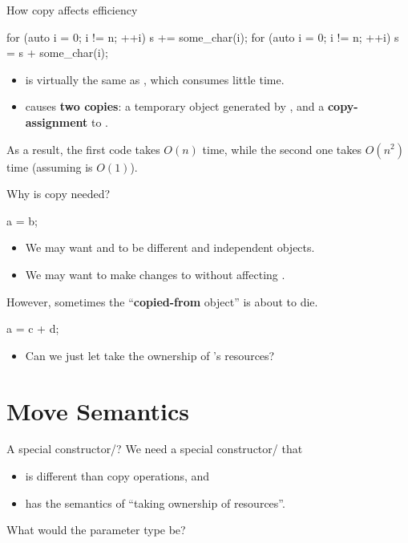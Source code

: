 \documentclass{beamer}
\begin{document}
\begin{frame}[fragile]{How copy affects efficiency}
  \begin{cpp}
for (auto i = 0; i != n; ++i)
  s += some_char(i);
for (auto i = 0; i != n; ++i)
  s = s + some_char(i);
  \end{cpp}
  \begin{itemize}
    \item {} is virtually the same as , which consumes little time.
    \item {} causes \textbf{two copies}: a temporary object generated by , and a \textbf{copy-assignment} to .
  \end{itemize}
  \pause
  As a result, the first code takes \(O(n)\) time, while the second one takes \(O\left(n^2\right)\) time (assuming  is \(O(1)\)).
\end{frame}

\begin{frame}[fragile]{Why is copy needed?}
  \begin{cpp}
a = b;
  \end{cpp}
  \begin{itemize}
    \item We may want  and  to be different and independent objects.
    \item We may want to make changes to  without affecting .
  \end{itemize}
  \pause
  However, sometimes the ``\textbf{copied-from} object'' is about to die.
  \begin{cpp}
a = c + d;
  \end{cpp}
  \begin{itemize}
    \item Can we just let  take the ownership of 's resources?
  \end{itemize}
\end{frame}

\section{Move Semantics}

\begin{frame}[fragile]{A special constructor/\ttt{=}?}
  We need a special constructor/ that
  \begin{itemize}
    \item is different than copy operations, and
    \item has the semantics of ``taking ownership of resources''.
  \end{itemize}
  What would the parameter type be?
\end{frame}
\end{document}
